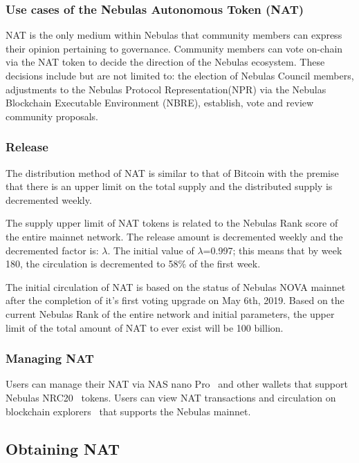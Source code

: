 \subsubsection{Use cases of the Nebulas Autonomous Token (NAT)}


NAT is the only medium within Nebulas that community members can express their opinion pertaining to governance. Community members can vote on-chain via the NAT token to decide the direction of the Nebulas ecosystem. These decisions include but are not limited to: the election of Nebulas Council members, adjustments to the Nebulas Protocol Representation(NPR) via the Nebulas Blockchain Executable Environment (NBRE), establish, vote and review community proposals.

\subsubsection{Release}
	
The distribution method of NAT is similar to that of Bitcoin with the premise that there is an upper limit on the total supply and the distributed supply is decremented weekly.

The supply upper limit of NAT tokens is related to the Nebulas Rank score of the entire mainnet network. The release amount is decremented weekly and the decremented factor is: $\lambda$. The initial value of $\lambda$=0.997; this means that by week 180, the circulation is decremented to 58\% of the first week.

The initial circulation of NAT is based on the status of Nebulas NOVA mainnet after the completion of it's first voting upgrade on May 6th, 2019. Based on the current Nebulas Rank of the entire network and initial parameters, the upper limit of the total amount of NAT to ever exist will be 100 billion.

\subsubsection{Managing NAT}

Users can manage their NAT via NAS nano Pro~\cite{NASnano} and other wallets that support Nebulas NRC20~\cite{wallets} tokens. Users can view NAT transactions and circulation on blockchain explorers~\cite{explorer} that supports the Nebulas mainnet.

\subsection{Obtaining NAT}

